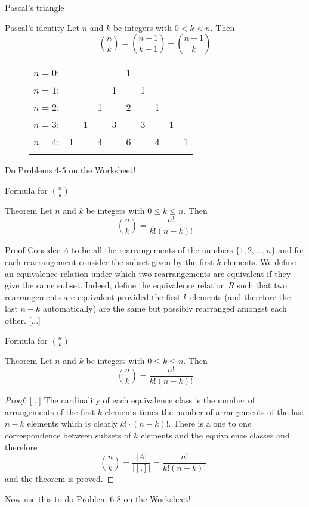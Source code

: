 \documentclass{beamer}
\def\bl[#1]#2{\begin{block}{#1}#2\end{block}}
\begin{document}
\begin{frame}{Pascal's triangle}
\bl[Pascal's identity]{
Let $n$ and $k$ be integers with $0<k<n$. Then
\vspace{-0.2cm}
\[
\binom{n}{k}=\binom{n-1}{k-1}+\binom{n-1}{k}
\]}
\begin{figure}
\centering
\begin{tabular}{rccccccccc}
$n=0$:&    &    &    &    &  1\\\noalign{\smallskip\smallskip}
$n=1$:&    &    &    &  1 &    &  1\\\noalign{\smallskip\smallskip}
$n=2$:&    &    &  1 &    &  2 &    &  1\\\noalign{\smallskip\smallskip}
$n=3$:&    &  1 &    &  3 &    &  3 &    &  1\\\noalign{\smallskip\smallskip}
$n=4$:&  1 &    &  4 &    &  6 &    &  4 &    &  1\\\noalign{\smallskip\smallskip}
\end{tabular}
\end{figure}
\vspace{0.4cm}
Do Problems 4-5 on the Worksheet!
\end{frame}

\begin{frame}{Formula for $\binom{n}{k}$}
\bl[Theorem]{
Let $n$ and $k$ be integers with $0\leq k\leq n$. Then\vspace{-0.2cm}
\[
\binom{n}{k}=\frac{n!}{k!(n-k)!}
\]}
\bl[Proof]{
Consider $A$ to be all the rearrangements of the numbers $\{1,2,\dots,n\}$ and for each rearrangement consider the subset given by the first $k$ elements. We define an equivalence relation under which two rearrangements are equivalent if they give the same subset. Indeed, define the equivalence relation $R$ such that two rearrangements are equivalent provided the first $k$ elements (and therefore the last $n-k$ automatically) are the same but possibly rearranged amongst each other.
[...]}
\end{frame}

\begin{frame}{Formula for $\binom{n}{k}$}\vspace{-0.2cm}
\bl[Theorem]{
Let $n$ and $k$ be integers with $0\leq k\leq n$. Then\vspace{-0.2cm}
\[
\binom{n}{k}=\frac{n!}{k!(n-k)!}
\]}
\begin{proof}

[...]
The cardinality of each equivalence class is the number of arrangements of the first $k$ elements times the number of arrangements of the last $n-k$ elements which is clearly $k!\cdot (n-k)!$. There is a one to one correspondence between subsets of $k$ elements and the equivalence classes and therefore
\[
\binom{n}{k}=\frac{|A|}{|[.]|}=\frac{n!}{k!(n-k)!},
\]
and the theorem is proved.
\end{proof}
\end{frame}
\begin{frame}
Now use this to do Problem 6-8 on the Worksheet!
\end{frame}
\end{document}
